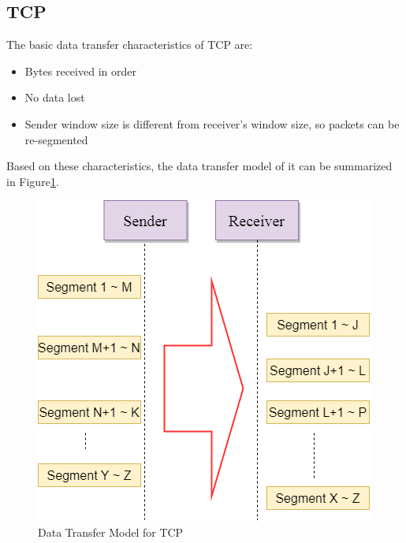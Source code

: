 \subsection{TCP}
The basic data transfer characteristics of TCP are:
\begin{itemize}
  \item Bytes received in order
  \item No data lost
  \item Sender window size is different from receiver's window size, so packets can be re-segmented
\end{itemize}
Based on these characteristics, the data transfer model of it can be summarized in Figure\ref{tcp}.
\begin{figure}[H]
\centerline{\includegraphics[scale=0.48]{Figures/tcp}}
 \caption{Data Transfer Model for TCP}
\label{tcp}
\end{figure}

